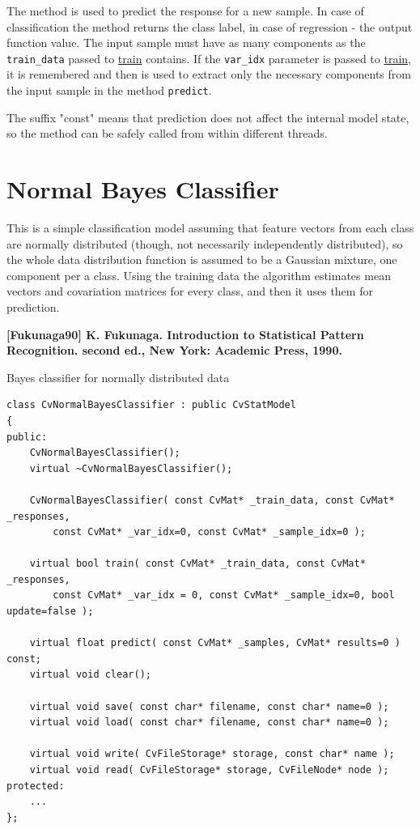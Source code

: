 The method is used to predict the response for a new sample. In case of classification the method returns the class label, in case of regression - the output function value. The input sample must have as many components as the \texttt{train\_data} passed to \href{#CvStatModel_train}{train} contains. If the \texttt{var\_idx} parameter is passed to \href{#CvStatModel_train}{train}, it is remembered and then is used to extract only the necessary components from the input sample in the method \texttt{predict}.

The suffix "const" means that prediction does not affect the internal model state, so the method can be safely called from within different threads.

\section{Normal Bayes Classifier}

This is a simple classification model assuming that feature vectors from each class are normally distributed (though, not necessarily independently distributed), so the whole data distribution function is assumed to be a Gaussian mixture, one component per a class. Using the training data the algorithm estimates mean vectors and covariation matrices for every class, and then it uses them for prediction.

\textbf{[Fukunaga90] K. Fukunaga. Introduction to Statistical Pattern Recognition. second ed., New York: Academic Press, 1990.}



Bayes classifier for normally distributed data

\begin{lstlisting}
class CvNormalBayesClassifier : public CvStatModel
{
public:
    CvNormalBayesClassifier();
    virtual ~CvNormalBayesClassifier();

    CvNormalBayesClassifier( const CvMat* _train_data, const CvMat* _responses,
        const CvMat* _var_idx=0, const CvMat* _sample_idx=0 );

    virtual bool train( const CvMat* _train_data, const CvMat* _responses,
        const CvMat* _var_idx = 0, const CvMat* _sample_idx=0, bool update=false );

    virtual float predict( const CvMat* _samples, CvMat* results=0 ) const;
    virtual void clear();

    virtual void save( const char* filename, const char* name=0 );
    virtual void load( const char* filename, const char* name=0 );

    virtual void write( CvFileStorage* storage, const char* name );
    virtual void read( CvFileStorage* storage, CvFileNode* node );
protected:
    ...
};
\end{lstlisting}



